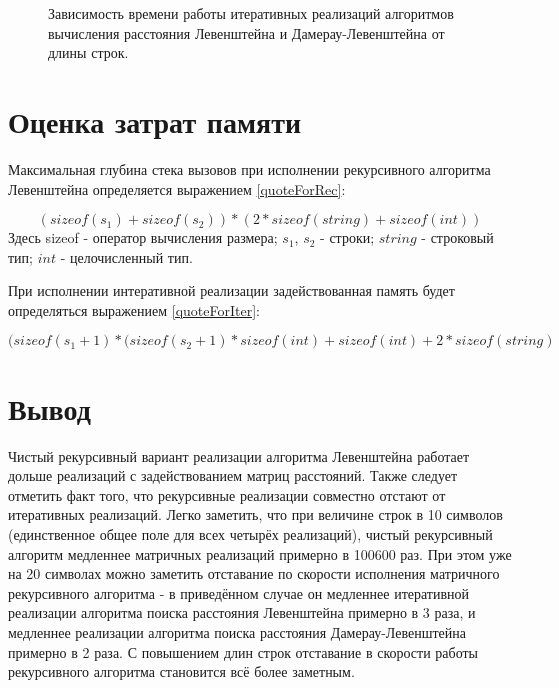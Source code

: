 \documentclass[12pt]{report}
\begin{document}
\begin{figure}[h]
	\begin{center}
	\captionsetup{justification=centering}
	\caption{Зависимость времени работы итеративных реализаций алгоритмов вычисления расстояния Левенштейна и Дамерау-Левенштейна от длины строк.}
	\label{IterTime}
	\end{center}
\end{figure}

\section{Оценка затрат памяти}
Максимальная глубина стека вызовов при исполнении рекурсивного алгоритма Левенштейна определяется выражением \ref{quoteForRec}:

\begin{equation}
\label{quoteForRec}
(sizeof(s_{1}) + sizeof(s_{2})) * (2 * sizeof(string) + sizeof(int))
\end{equation}
Здесь sizeof - оператор вычисления размера; $s_{1}$, $s_{2}$ - строки; $string$ - строковый тип; $int$ - целочисленный тип.

При исполнении интеративной реализации задействованная память будет определяться выражением \ref{quoteForIter}:

\begin{equation}
\label{quoteForIter}
(sizeof(s_{1} + 1) * (sizeof(s_{2} + 1) * sizeof(int) + sizeof(int) + 2 * sizeof(string)
\end{equation}

\section*{Вывод}
Чистый рекурсивный вариант реализации алгоритма Левенштейна работает дольше реализаций с задействованием матриц расстояний. Также следует отметить факт того, что рекурсивные реализации совместно отстают от итеративных реализаций. Легко заметить, что при величине строк в 10 символов (единственное общее поле для всех четырёх реализаций), чистый рекурсивный алгоритм медленнее матричных реализаций примерно в 100600 раз. При этом уже на 20 символах можно заметить отставание по скорости исполнения матричного рекурсивного алгоритма - в приведённом случае он медленнее итеративной реализации алгоритма поиска расстояния Левенштейна примерно в 3 раза, и медленнее реализации алгоритма поиска расстояния Дамерау-Левенштейна примерно в 2 раза. С повышением длин строк отставание в скорости работы рекурсивного алгоритма становится всё более заметным.
\end{document}
